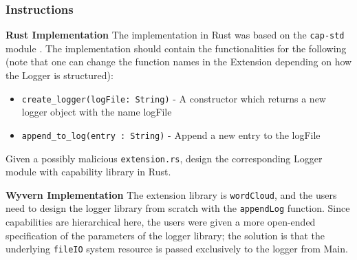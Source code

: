 \subsubsection{Instructions}
\noindent
\textbf{Rust Implementation}
The implementation in Rust was based on the \texttt{cap-std} module \cite{rustCap}. The implementation should contain the functionalities for the following (note that one can change the function names in the Extension depending on how the Logger is structured): 

\begin{itemize}
    \item \texttt{create_logger(logFile: String)} - A constructor which returns a new logger object with the name logFile
    \item \texttt{append_to_log(entry : String)} - Append a new entry to the logFile
\end{itemize}


Given a possibly malicious \texttt{extension.rs}, design the corresponding Logger module with capability library in Rust.

\noindent
\textbf{Wyvern Implementation} The extension library is \texttt{wordCloud}, and the users need to design the logger library from scratch with the \texttt{appendLog} function. Since capabilities are hierarchical here, the users were given a more open-ended specification of the parameters of the logger library; the solution is that the underlying \texttt{fileIO} system resource is passed exclusively to the logger from Main.

